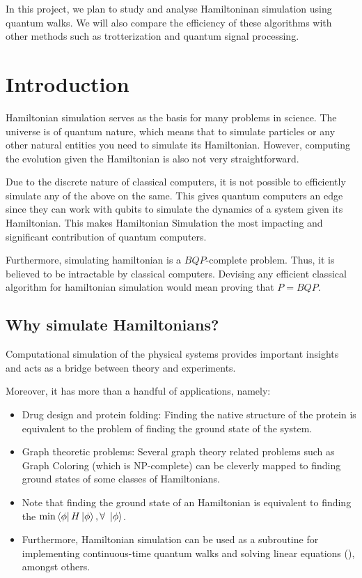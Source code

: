 \documentclass[
10pt, %
a4paper, %
oneside, %
headinclude,footinclude, %
BCOR5mm, %
]{scrartcl}
\begin{document}
In this project, we plan to study and analyse Hamiltoninan simulation using quantum walks. We will also compare the efficiency of these algorithms with other methods such as trotterization and quantum signal processing.


\section{Introduction}
Hamiltonian simulation serves as the basis for many problems in science. The universe is of quantum nature, which means that to simulate particles or any other natural entities you need to simulate its Hamiltonian. However, computing the evolution given the Hamiltonian is also not very straightforward.\newline

Due to the discrete nature of classical computers, it is not possible to efficiently simulate any of the above on the same. This gives quantum computers an edge since they can work with qubits to simulate the dynamics of a system given its Hamiltonian. This makes Hamiltonian Simulation the most impacting and significant contribution of quantum computers.\newline

Furthermore, simulating hamiltonian is a $BQP$-complete problem. Thus, it is believed to be intractable by classical computers. Devising any efficient classical algorithm for hamiltonian simulation would mean proving that $P = BQP$.

\subsection{Why simulate Hamiltonians?}
Computational simulation of the physical systems provides important insights and acts as a bridge between theory and experiments.\newline

Moreover, it has more than a handful of applications, namely:
\begin{itemize}
    \item Drug design and protein folding: Finding the native structure of the protein is equivalent to the problem of finding the ground state of the system.
    \item Graph theoretic problems: Several graph theory related problems such as Graph Coloring (which is NP-complete) can be cleverly mapped to finding ground states of some classes of Hamiltonians.
    \item Note that finding the ground state of an Hamiltonian is equivalent to finding the $\min \bra{\phi}H\ket{\phi}, \forall\ \ket{\phi}$.
    \item Furthermore, Hamiltonian simulation can be used as a subroutine for implementing continuous-time quantum walks and solving linear equations (), amongst others.
\end{itemize}
\end{document}
